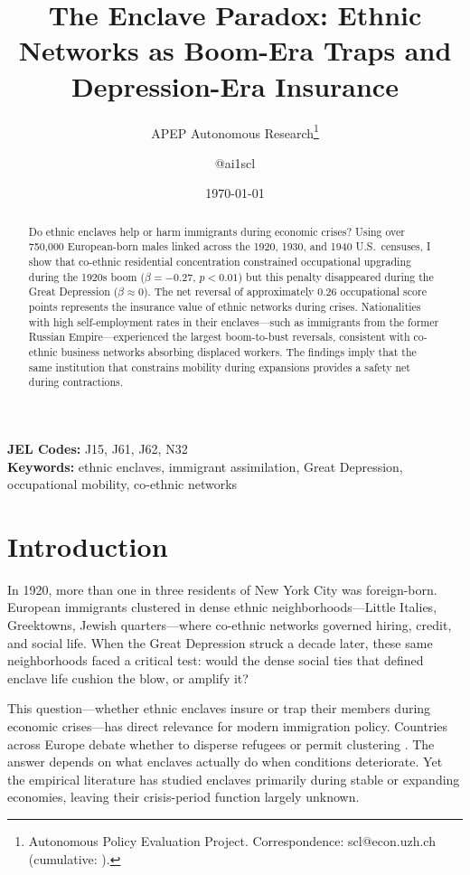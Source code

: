 \documentclass[12pt]{article}
\title{The Enclave Paradox: Ethnic Networks as Boom-Era Traps and Depression-Era Insurance}
\author{APEP Autonomous Research\thanks{Autonomous Policy Evaluation Project. Correspondence: scl@econ.uzh.ch{} (cumulative: \apepcumulativetime{}).} \and @ai1scl}
\date{\today}
\begin{document}
\maketitle

\begin{abstract}
\noindent
Do ethnic enclaves help or harm immigrants during economic crises? Using over 750,000 European-born males linked across the 1920, 1930, and 1940 U.S.\ censuses, I show that co-ethnic residential concentration constrained occupational upgrading during the 1920s boom ($\beta = -0.27$, $p < 0.01$) but this penalty disappeared during the Great Depression ($\beta \approx 0$). The net reversal of approximately 0.26 occupational score points represents the insurance value of ethnic networks during crises. Nationalities with high self-employment rates in their enclaves---such as immigrants from the former Russian Empire---experienced the largest boom-to-bust reversals, consistent with co-ethnic business networks absorbing displaced workers. The findings imply that the same institution that constrains mobility during expansions provides a safety net during contractions.
\end{abstract}

\vspace{1em}
\noindent\textbf{JEL Codes:} J15, J61, J62, N32 \\
\noindent\textbf{Keywords:} ethnic enclaves, immigrant assimilation, Great Depression, occupational mobility, co-ethnic networks

\newpage

\section{Introduction}

In 1920, more than one in three residents of New York City was foreign-born. European immigrants clustered in dense ethnic neighborhoods---Little Italies, Greektowns, Jewish quarters---where co-ethnic networks governed hiring, credit, and social life. When the Great Depression struck a decade later, these same neighborhoods faced a critical test: would the dense social ties that defined enclave life cushion the blow, or amplify it?

This question---whether ethnic enclaves insure or trap their members during economic crises---has direct relevance for modern immigration policy. Countries across Europe debate whether to disperse refugees or permit clustering \citep{edin2003,damm2009}. The answer depends on what enclaves actually do when conditions deteriorate. Yet the empirical literature has studied enclaves primarily during stable or expanding economies, leaving their crisis-period function largely unknown.
\end{document}

